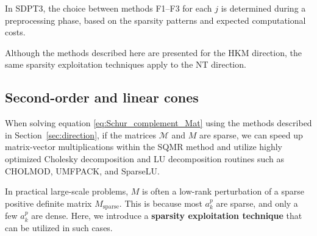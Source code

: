 In SDPT3, the choice between methods F1--F3 for each $j$ is determined during a preprocessing phase, based on the sparsity patterns and expected computational costs.

Although the methods described here are presented for the HKM direction, the same sparsity exploitation techniques apply to the NT direction.


\subsection{Second-order and linear cones} \label{sec:exploit_sparsity_socp_lp}
When solving equation \eqref{eq:Schur_complement_Mat} using the methods described in Section~\ref{sec:direction},
if the matrices $\mathcal{M}$ and $M$ are sparse, we can speed up matrix-vector multiplications within the SQMR method and utilize highly optimized Cholesky decomposition and LU decomposition routines such as CHOLMOD, UMFPACK, and SparseLU.

In practical large-scale problems, $M$ is often a low-rank perturbation of a sparse positive definite matrix $M_{\mathrm{sparse}}$. This is because most $a^p_k$ are sparse, and only a few $a^p_k$ are dense.
Here, we introduce a \textbf{sparsity exploitation technique} that can be utilized in such cases.

